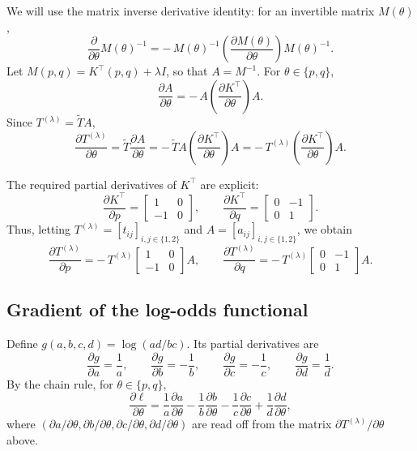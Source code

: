 \documentclass[pdflatex,sn-mathphys-num]{sn-jnl}%
\theoremstyle{thmstyleone}%
\theoremstyle{thmstyletwo}%
\theoremstyle{thmstylethree}%
\begin{document}
We will use the matrix inverse derivative identity: for an invertible matrix $M(\theta)$,
\[
\frac{\partial}{\partial \theta}M(\theta)^{-1}
=
-\,M(\theta)^{-1}\left(\frac{\partial M(\theta)}{\partial \theta}\right)M(\theta)^{-1}.
\]
Let $M(p,q)=K^\top(p,q)+\lambda I$, so that $A=M^{-1}$.
For $\theta\in\{p,q\}$,
\[
\frac{\partial A}{\partial \theta}
=
-\,A\left(\frac{\partial K^\top}{\partial \theta}\right)A.
\]
Since $T^{(\lambda)}=\tilde T A$,
\[
\frac{\partial T^{(\lambda)}}{\partial \theta}
=
\tilde T \frac{\partial A}{\partial \theta}
=
-\,\tilde T A\left(\frac{\partial K^\top}{\partial \theta}\right)A
=
-\,T^{(\lambda)}\left(\frac{\partial K^\top}{\partial \theta}\right)A.
\]

The required partial derivatives of $K^\top$ are explicit:
\[
\frac{\partial K^\top}{\partial p}
=
\begin{bmatrix}
1 & 0\\
-1 & 0
\end{bmatrix},
\qquad
\frac{\partial K^\top}{\partial q}
=
\begin{bmatrix}
0 & -1\\
0 & 1
\end{bmatrix}.
\]
Thus, letting $T^{(\lambda)}=[t_{ij}]_{i,j\in\{1,2\}}$ and $A=[a_{ij}]_{i,j\in\{1,2\}}$, we obtain
\[
\frac{\partial T^{(\lambda)}}{\partial p}
=
-\,T^{(\lambda)}
\begin{bmatrix}
1 & 0\\
-1 & 0
\end{bmatrix}A,
\qquad
\frac{\partial T^{(\lambda)}}{\partial q}
=
-\,T^{(\lambda)}
\begin{bmatrix}
0 & -1\\
0 & 1
\end{bmatrix}A.
\]

\subsection*{Gradient of the log-odds functional}

Define $g(a,b,c,d)=\log(ad/bc)$. Its partial derivatives are
\[
\frac{\partial g}{\partial a}=\frac{1}{a},\qquad
\frac{\partial g}{\partial b}=-\frac{1}{b},\qquad
\frac{\partial g}{\partial c}=-\frac{1}{c},\qquad
\frac{\partial g}{\partial d}=\frac{1}{d}.
\]
By the chain rule, for $\theta\in\{p,q\}$,
\[
\frac{\partial \ell}{\partial \theta}
=
\frac{1}{a}\frac{\partial a}{\partial \theta}
-\frac{1}{b}\frac{\partial b}{\partial \theta}
-\frac{1}{c}\frac{\partial c}{\partial \theta}
+\frac{1}{d}\frac{\partial d}{\partial \theta},
\]
where $(\partial a/\partial\theta,\partial b/\partial\theta,\partial c/\partial\theta,\partial d/\partial\theta)$
are read off from the matrix $\partial T^{(\lambda)}/\partial\theta$ above.
\end{document}
